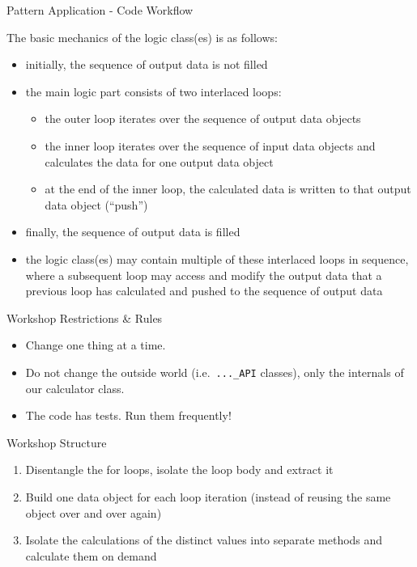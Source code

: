 \begin{frame}[fragile]{Pattern Application - Code Workflow}

The basic mechanics of the logic class(es) is as follows:

\begin{itemize}
\item initially, the sequence of output data is not filled
\item the main logic part consists of two interlaced loops: 
\begin{itemize}
\item the outer loop iterates over the sequence of output data objects
\item the inner loop iterates over the sequence of input data objects and calculates the data for one output data object
\item at the end of the inner loop, the calculated data is written to that output data object (``push'')
\end{itemize}
\item finally, the sequence of output data is filled
\item the logic class(es) may contain multiple of these interlaced loops in sequence, where a subsequent loop may access and modify the output data that a previous loop has calculated and pushed to the sequence of output data
\end{itemize}

\end{frame}


\begin{frame}[fragile]{Workshop Restrictions \& Rules}

\begin{itemize}
\item Change one thing at a time.
\item Do not change the outside world (i.e.~\texttt{...\_API} classes), only the internals of our calculator class.
\item The code has tests. Run them frequently!
\end{itemize}

\end{frame}




\begin{frame}[fragile]{Workshop Structure}


\begin{enumerate}
\item Disentangle the for loops, isolate the loop body and extract it
\item Build one data object for each loop iteration (instead of reusing the same object over and over again)
\item Isolate the calculations of the distinct values into separate methods and calculate them on demand
\end{enumerate}

\end{frame}



